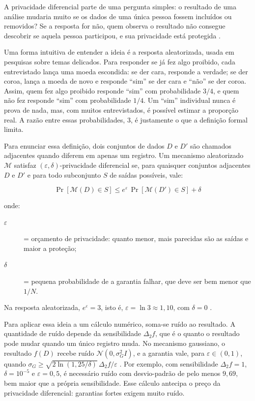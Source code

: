 A privacidade diferencial parte de uma pergunta simples: o resultado de uma análise mudaria muito se os dados de uma única pessoa fossem incluídos ou removidos? Se a resposta for não, quem observa o resultado não consegue descobrir se aquela pessoa participou, e sua privacidade está protegida \cite{Dwork2006}.

Uma forma intuitiva de entender a ideia é a resposta aleatorizada, usada em pesquisas sobre temas delicados. Para responder se já fez algo proibido, cada entrevistado lança uma moeda escondida: se der cara, responde a verdade; se der coroa, lança a moeda de novo e responde ``sim'' se der cara e ``não'' se der coroa. Assim, quem fez algo proibido responde ``sim'' com probabilidade $3/4$, e quem não fez responde ``sim'' com probabilidade $1/4$. Um ``sim'' individual nunca é prova de nada, mas, com muitos entrevistados, é possível estimar a proporção real. A razão entre essas probabilidades, $3$, é justamente o que a definição formal limita.

Para enunciar essa definição, dois conjuntos de dados $D$ e $D'$ são chamados adjacentes quando diferem em apenas um registro. Um mecanismo aleatorizado $\mathcal{M}$ satisfaz $(\varepsilon, \delta)$-privacidade diferencial se, para quaisquer conjuntos adjacentes $D$ e $D'$ e para todo subconjunto $S$ de saídas possíveis, vale:

\begin{equation} \label{eq:dp}
\Pr[\mathcal{M}(D) \in S] \leq e^{\varepsilon} \, \Pr[\mathcal{M}(D') \in S] + \delta
\end{equation}

\noindent onde:
\begin{description}
  \item[$\varepsilon$] = orçamento de privacidade: quanto menor, mais parecidas são as saídas e maior a proteção;
  \item[$\delta$] = pequena probabilidade de a garantia falhar, que deve ser bem menor que $1/N$.
\end{description}

Na resposta aleatorizada, $e^{\varepsilon} = 3$, isto é, $\varepsilon = \ln 3 \approx 1{,}10$, com $\delta = 0$ \cite{Dwork2014}.

Para aplicar essa ideia a um cálculo numérico, soma-se ruído ao resultado. A quantidade de ruído depende da sensibilidade $\Delta_2 f$, que é o quanto o resultado pode mudar quando um único registro muda. No mecanismo gaussiano, o resultado $f(D)$ recebe ruído $\mathcal{N}(0, \sigma_G^{2} I)$, e a garantia vale, para $\varepsilon \in (0, 1)$, quando $\sigma_G \geq \sqrt{2 \ln(1{,}25/\delta)} \, \Delta_2 f / \varepsilon$ \cite{Dwork2014}. Por exemplo, com sensibilidade $\Delta_2 f = 1$, $\delta = 10^{-5}$ e $\varepsilon = 0{,}5$, é necessário ruído com desvio-padrão de pelo menos $9{,}69$, bem maior que a própria sensibilidade. Esse cálculo antecipa o preço da privacidade diferencial: garantias fortes exigem muito ruído.

